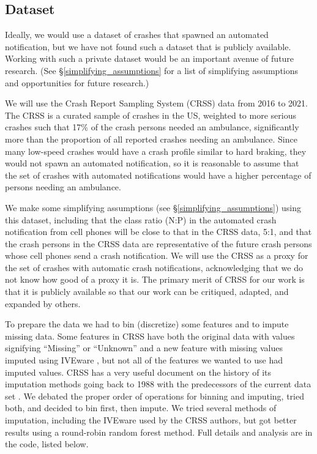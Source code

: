 \subsection{Dataset}
\label{dataset}

Ideally, we would use a dataset of crashes that spawned an automated notification, but we have not found such a dataset that is publicly available.  Working with such a private dataset would be an important avenue of future research. (See \S \ref{simplifying_assumptions} for a list of simplifying assumptions and opportunities for future research.)

We will use the Crash Report Sampling System (CRSS) data from 2016 to 2021.  The CRSS is a curated sample of crashes in the US, weighted to more serious crashes such that 17\% of the crash persons needed an ambulance, significantly more than the proportion of all reported crashes needing an ambulance.  Since many low-speed crashes would have a crash profile similar to hard braking, they would not spawn an automated notification, so it is reasonable to assume that the set of crashes with automated notifications would have a higher percentage of persons needing an ambulance.  

We make some simplifying assumptions (see \S\ref{simplifying_assumptions}) using this dataset, including that the class ratio (N:P) in the automated crash notification from cell phones will be close to that in the CRSS data, 5:1, and that the crash persons in the CRSS data are representative of the future crash persons whose cell phones send a crash notification.  We will use the CRSS as a proxy for the set of crashes with automatic crash notifications, acknowledging that we do not know how good of a proxy it is. The primary merit of CRSS for our work is that it is publicly available so that our work can be critiqued, adapted, and expanded by others.  

To prepare the data we had to bin (discretize) some features and to impute missing data.  Some features in CRSS have both the original data with values signifying ``Missing'' or ``Unknown'' and a new feature with missing values imputed using IVEware \citep{IVEware}, but not all of the features we wanted to use had imputed values.  CRSS has a very useful document on the history of its imputation methods going back to 1988 with the predecessors of the current data set \citep{CRSS_Imputation}.  We debated the proper order of operations for binning and imputing, tried both, and decided to bin first, then impute.  We tried several methods of imputation, including the IVEware used by the CRSS authors, but got better results using a round-robin random forest method.  Full details and analysis are in the code, listed below.

